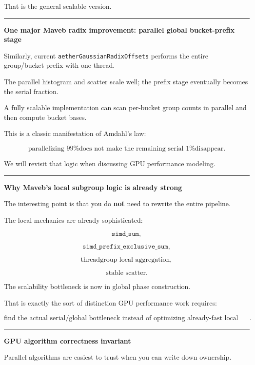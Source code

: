 That is the general scalable version.

\begin{center}\rule{0.5\linewidth}{0.5pt}\end{center}

\textbf{One major Maveb radix improvement: parallel global bucket-prefix stage}

Similarly, current \texttt{aetherGaussianRadixOffsets} performs the entire group/bucket prefix with one thread.

The parallel histogram and scatter scale well; the prefix stage eventually becomes the serial fraction.

A fully scalable implementation can scan per-bucket group counts in parallel and then compute bucket bases.

This is a classic manifestation of Amdahl's law:

\[
\boxed{
\text{parallelizing 99\% does not make the remaining serial 1\% disappear}.
}
\]

We will revisit that logic when discussing GPU performance modeling.

\begin{center}\rule{0.5\linewidth}{0.5pt}\end{center}

\textbf{Why Maveb's local subgroup logic is already strong}

The interesting point is that you do \textbf{not} need to rewrite the entire pipeline.

The local mechanics are already sophisticated:

\[
\texttt{simd\_sum},
\]

\[
\texttt{simd\_prefix\_exclusive\_sum},
\]

\[
\text{threadgroup-local aggregation},
\]

\[
\text{stable scatter}.
\]

The scalability bottleneck is now in global phase construction.

That is exactly the sort of distinction GPU performance work requires:

\[
\boxed{
\text{find the actual serial/global bottleneck instead of optimizing already-fast local math}.
}
\]

\begin{center}\rule{0.5\linewidth}{0.5pt}\end{center}

\textbf{GPU algorithm correctness invariant}

Parallel algorithms are easiest to trust when you can write down ownership.

